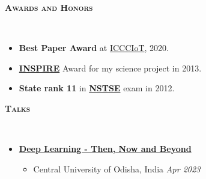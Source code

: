 \documentclass[10pt]{article}
\renewcommand{\section}[1]{
\bigskip
  \begin{Large}
  {\textsc{\textbf{#1}}}
  \end{Large}
  \hrulefill
  \medskip
  \\
}
\newenvironment{midlist}[1][\enskip\textbullet]%
        {\begin{itemize}[#1,leftmargin=*,parsep=0pt,itemsep=2pt,topsep=0pt,partopsep=0pt]}
        {\end{itemize}}
\newenvironment{lonemidlist}[1][\enskip\textbullet]%
        {\begin{itemize}[#1,leftmargin=*,parsep=0pt,itemsep=4pt,topsep=0pt,partopsep=0pt]}
        {\end{itemize}}
\begin{document}
\section{Awards and Honors}
\vspace{-4mm}
\begin{midlist}
\item \textbf{Best Paper Award} at \href{https://link.springer.com/book/10.1007/978-981-15-6198-6}{ICCCIoT}, 2020.
\item \href{https://online-inspire.gov.in/}{\textbf{INSPIRE}} Award for my science project in 2013. 
\item \textbf{State rank 11} in \href{https://www.unifiedcouncil.com/about-nstse-online.html}{\textbf{NSTSE}} exam in 2012.
\end{midlist}


\section{Talks}
\vspace{-4mm}
\begin{lonemidlist}
\item\href{https://docs.google.com/presentation/d/1B4fY_jALCVDi2TN13jeHtQngEngYqBdBN9k7VFwzvgE/edit#slide=id.p}{\textbf{Deep Learning - Then, Now and Beyond}}
\begin{itemize}
    \item Central University of Odisha, India \hfill{\textit{Apr 2023}}
\end{itemize}
\end{lonemidlist}
\end{document}

